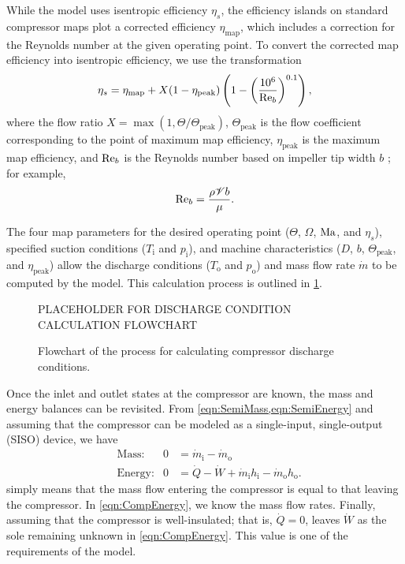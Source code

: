 While the model uses isentropic efficiency $\eta_s$, 
the efficiency islands on standard compressor maps plot a corrected efficiency $\eta_{\text{map}}$,
which includes a correction for the Reynolds number at the given operating point.
To convert the corrected map efficiency into isentropic efficiency, 
we use the transformation
\begin{equation}
  \eta_s = \eta_{\text{map}} + X(1 - \eta_{\text{peak}})\left(1-\left(\frac{10^6}{\mathrm{Re}_b}\right)^{0.1}\right),
\end{equation}
where the flow ratio $X = \max{(1,\Theta/\Theta_{\text{peak}})}$, 
$\Theta_{\text{peak}}$ is the flow coefficient 
corresponding to the point of maximum map efficiency,
$\eta_{\text{peak}}$ is the maximum map efficiency,
and $\mathrm{Re}_b$ is the Reynolds number 
based on impeller tip width $b$%
; for example,
\begin{equation}
\text{Re}_b=\frac{\rho \mathscr{V} b}{\mu}.
\end{equation}

The four map parameters for the desired operating point 
($\Theta$, $\Omega$, $\mathrm{Ma}$, and $\eta_s$), 
specified suction conditions ($T_{\text{i}}$ and $p_{\text{i}}$), 
and machine characteristics ($D$, $b$, $\Theta_{\text{peak}}$, and $\eta_{\text{peak}}$) 
allow the discharge conditions ($T_{\text{o}}$ and $p_{\text{o}}$) 
and mass flow rate $\dot{m}$ to be computed by the model. 
This calculation process is outlined in \cref{fig:DischargeCalc}.
\begin{figure}[htbp]
  \centering
  PLACEHOLDER FOR DISCHARGE CONDITION CALCULATION FLOWCHART
  \caption{Flowchart of the process for calculating compressor discharge conditions.}
  \label{fig:DischargeCalc}
\end{figure}

Once the inlet and outlet states at the compressor are known, 
the mass and energy balances can be revisited. 
From \cref{eqn:SemiMass,eqn:SemiEnergy} and
 assuming that the compressor can be modeled as a 
single-input, single-output (SISO) device, we have
\begin{align}
  &\text{Mass:}   & 0 &= {\dot{m}_{\text{i}}} - {\dot{m}_{\text{o}}} \label{eqn:CompMass}\\
  &\text{Energy:} & 0 &= \dot{Q} - \dot{W} + {\dot{m}_{\text{i}}h_{\text{i}}} - 
		{\dot{m}_{\text{o}}h_{\text{o}}} \label{eqn:CompEnergy}.
\end{align}
 simply means that the mass flow 
entering the compressor is equal to that leaving the compressor. 
In \cref{eqn:CompEnergy}, we know the mass flow rates. 
Finally, assuming that the compressor is well-insulated; 
that is, $\dot{Q}=0$, leaves $\dot{W}$ 
as the sole remaining unknown in \cref{eqn:CompEnergy}. 
This value is one of the requirements of the model. 

